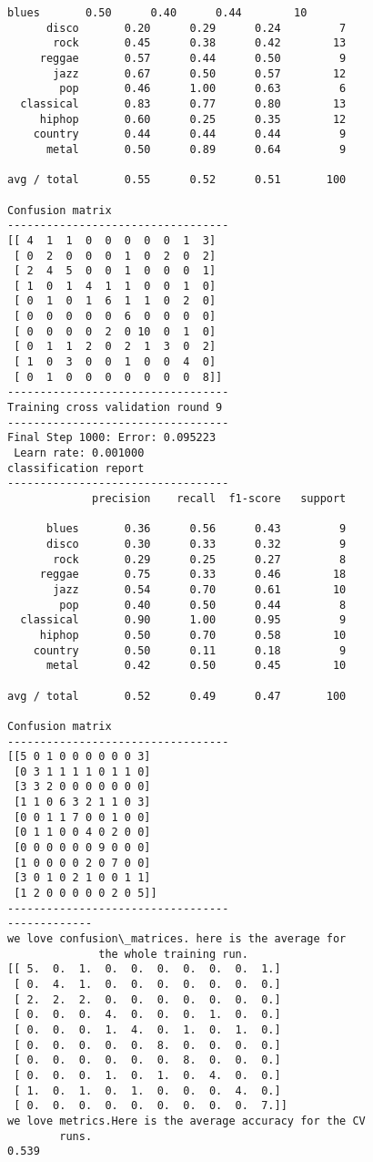 \documentclass{article}
\begin{document}
\begin{Verbatim}[commandchars=\\\{\}]
      blues       0.50      0.40      0.44        10
      disco       0.20      0.29      0.24         7
       rock       0.45      0.38      0.42        13
     reggae       0.57      0.44      0.50         9
       jazz       0.67      0.50      0.57        12
        pop       0.46      1.00      0.63         6
  classical       0.83      0.77      0.80        13
     hiphop       0.60      0.25      0.35        12
    country       0.44      0.44      0.44         9
      metal       0.50      0.89      0.64         9

avg / total       0.55      0.52      0.51       100

Confusion matrix
----------------------------------
[[ 4  1  1  0  0  0  0  0  1  3]
 [ 0  2  0  0  0  1  0  2  0  2]
 [ 2  4  5  0  0  1  0  0  0  1]
 [ 1  0  1  4  1  1  0  0  1  0]
 [ 0  1  0  1  6  1  1  0  2  0]
 [ 0  0  0  0  0  6  0  0  0  0]
 [ 0  0  0  0  2  0 10  0  1  0]
 [ 0  1  1  2  0  2  1  3  0  2]
 [ 1  0  3  0  0  1  0  0  4  0]
 [ 0  1  0  0  0  0  0  0  0  8]]
----------------------------------
Training cross validation round 9
----------------------------------
Final Step 1000: Error: 0.095223 
 Learn rate: 0.001000
classification report 
----------------------------------
             precision    recall  f1-score   support

      blues       0.36      0.56      0.43         9
      disco       0.30      0.33      0.32         9
       rock       0.29      0.25      0.27         8
     reggae       0.75      0.33      0.46        18
       jazz       0.54      0.70      0.61        10
        pop       0.40      0.50      0.44         8
  classical       0.90      1.00      0.95         9
     hiphop       0.50      0.70      0.58        10
    country       0.50      0.11      0.18         9
      metal       0.42      0.50      0.45        10

avg / total       0.52      0.49      0.47       100

Confusion matrix
----------------------------------
[[5 0 1 0 0 0 0 0 0 3]
 [0 3 1 1 1 1 0 1 1 0]
 [3 3 2 0 0 0 0 0 0 0]
 [1 1 0 6 3 2 1 1 0 3]
 [0 0 1 1 7 0 0 1 0 0]
 [0 1 1 0 0 4 0 2 0 0]
 [0 0 0 0 0 0 9 0 0 0]
 [1 0 0 0 0 2 0 7 0 0]
 [3 0 1 0 2 1 0 0 1 1]
 [1 2 0 0 0 0 0 2 0 5]]
----------------------------------
-------------
we love confusion\_matrices. here is the average for
              the whole training run.
[[ 5.  0.  1.  0.  0.  0.  0.  0.  0.  1.]
 [ 0.  4.  1.  0.  0.  0.  0.  0.  0.  0.]
 [ 2.  2.  2.  0.  0.  0.  0.  0.  0.  0.]
 [ 0.  0.  0.  4.  0.  0.  0.  1.  0.  0.]
 [ 0.  0.  0.  1.  4.  0.  1.  0.  1.  0.]
 [ 0.  0.  0.  0.  0.  8.  0.  0.  0.  0.]
 [ 0.  0.  0.  0.  0.  0.  8.  0.  0.  0.]
 [ 0.  0.  0.  1.  0.  1.  0.  4.  0.  0.]
 [ 1.  0.  1.  0.  1.  0.  0.  0.  4.  0.]
 [ 0.  0.  0.  0.  0.  0.  0.  0.  0.  7.]]
we love metrics.Here is the average accuracy for the CV
        runs.
0.539
    \end{Verbatim}
\end{document}
